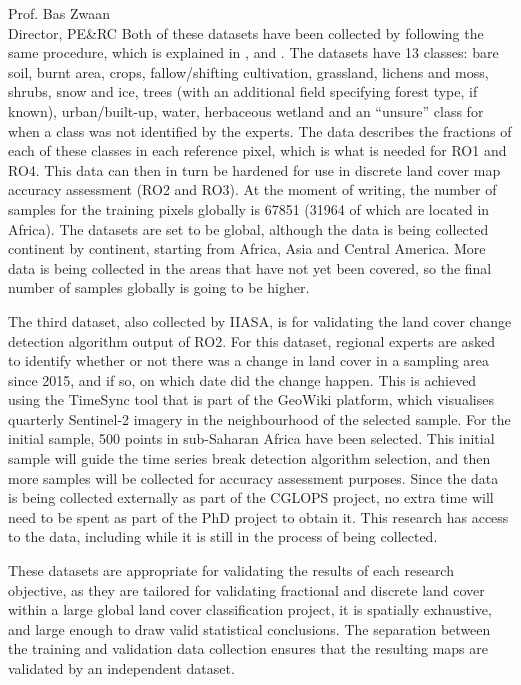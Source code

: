 \documentclass[a4paper,10pt,backaddress=false]{scrartcl}
\begin{document}
\begin{letter}{Prof. Bas Zwaan \\ Director, PE\&RC}
Both of these datasets have been collected by following the same procedure, which is explained in \citet{smets_product_2017}, \citet{tsendbazar_validation_2018} and \citet{tsendbazar_developing_2018}. The datasets have 13 classes: bare soil, burnt area, crops, fallow/shifting cultivation, grassland, lichens and moss, shrubs, snow and ice, trees (with an additional field specifying forest type, if known), urban/built-up, water, herbaceous wetland and an ``unsure'' class for when a class was not identified by the experts. The data describes the fractions of each of these classes in each reference pixel, which is what is needed for RO1 and RO4. This data can then in turn be hardened for use in discrete land cover map accuracy assessment (RO2 and RO3). At the moment of writing, the number of samples for the training pixels globally is 67851 (31964 of which are located in Africa). The datasets are set to be global, although the data is being collected continent by continent, starting from Africa, Asia and Central America. More data is being collected in the areas that have not yet been covered, so the final number of samples globally is going to be higher.

The third dataset, also collected by IIASA, is for validating the land cover change detection algorithm output of RO2. For this dataset, regional experts are asked to identify whether or not there was a change in land cover in a sampling area since 2015, and if so, on which date did the change happen. This is achieved using the TimeSync tool that is part of the GeoWiki platform, which visualises quarterly Sentinel-2 imagery in the neighbourhood of the selected sample. For the initial sample, 500 points in sub-Saharan Africa have been selected. This initial sample will guide the time series break detection algorithm selection, and then more samples will be collected for accuracy assessment purposes. Since the data is being collected externally as part of the CGLOPS project, no extra time will need to be spent as part of the PhD project to obtain it. This research has access to the data, including while it is still in the process of being collected.

These datasets are appropriate for validating the results of each research objective, as they are tailored for validating fractional and discrete land cover within a large global land cover classification project, it is spatially exhaustive, and large enough to draw valid statistical conclusions. The separation between the training and validation data collection ensures that the resulting maps are validated by an independent dataset.


\end{letter}
\end{document}
